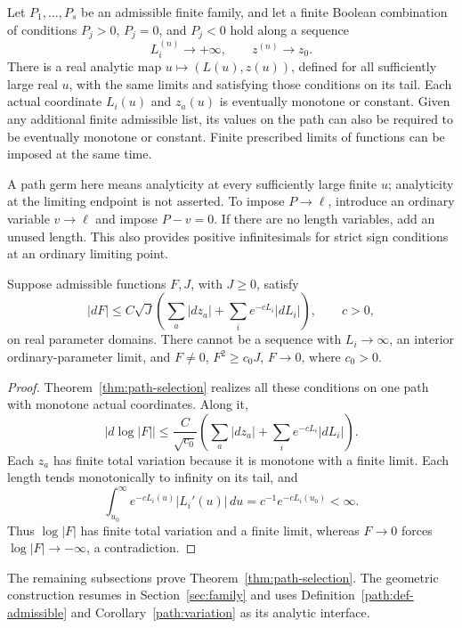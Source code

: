 \begin{theorem}\label{thm:path-selection}
Let \(P_1,\ldots,P_s\) be an admissible finite family, and let a finite
Boolean combination of conditions \(P_j>0\), \(P_j=0\), and \(P_j<0\)
hold along a sequence
\[
 L_i^{(n)}\longrightarrow+\infty,\qquad z^{(n)}\longrightarrow z_0.
\]
There is a real analytic map \(u\mapsto(L(u),z(u))\), defined for all
sufficiently large real \(u\), with the same limits and satisfying those
conditions on its tail.  Each actual coordinate \(L_i(u)\) and
\(z_a(u)\) is eventually monotone or constant.  Given any additional
finite admissible list, its values on the path can also be required to be
eventually monotone or constant.  Finite prescribed limits of functions
can be imposed at the same time.
\end{theorem}

A path germ here means analyticity at every sufficiently large finite
\(u\); analyticity at the limiting endpoint is not asserted.  To impose
\(P\to\ell\), introduce an ordinary variable \(v\to\ell\) and impose
\(P-v=0\).  If there are no length variables, add an unused length.  This
also provides positive infinitesimals for strict sign conditions at an
ordinary limiting point.

\begin{corollary}\label{path:variation}
Suppose admissible functions \(F,J\), with \(J\ge0\), satisfy
\[
 |dF|\le C\sqrt J\left(\sum_a|dz_a|
                  +\sum_i e^{-cL_i}|dL_i|\right),\qquad c>0,
\]
on real parameter domains.  There cannot be a sequence with
\(L_i\to\infty\), an interior ordinary-parameter limit, and
\(F\ne0\), \(F^2\ge c_0J\), \(F\to0\), where \(c_0>0\).
\end{corollary}
\begin{proof}
Theorem~\ref{thm:path-selection} realizes all these conditions on one
path with monotone actual coordinates.  Along it,
\[
 |d\log|F||\le\frac C{\sqrt{c_0}}
       \left(\sum_a|dz_a|+\sum_i e^{-cL_i}|dL_i|\right).
\]
Each \(z_a\) has finite total variation because it is monotone with
a finite limit.  Each length tends monotonically to infinity on its
tail, and
\[
 \int_{u_0}^\infty e^{-cL_i(u)}|L_i'(u)|\,du
       =c^{-1}e^{-cL_i(u_0)}<\infty.
\]
Thus \(\log|F|\) has finite total variation and a finite limit, whereas
\(F\to0\) forces \(\log|F|\to-\infty\), a contradiction.
\end{proof}

The remaining subsections prove Theorem~\ref{thm:path-selection}.
The geometric construction resumes in Section~\ref{sec:family} and
uses Definition~\ref{path:def-admissible} and
Corollary~\ref{path:variation} as its analytic interface.

